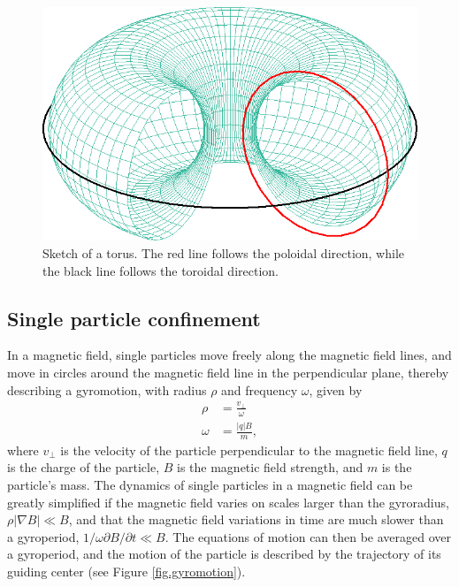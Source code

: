 \documentclass[my_thesis.tex]{subfiles}
\begin{document}
\begin{figure}
    \centering
    \includegraphics[width=.75\linewidth]{images/torus.png}
    \caption{Sketch of a torus. The red line follows the poloidal direction, while the black line follows the toroidal direction.}
    \label{fig.torus}
\end{figure}

\subsection{Single particle confinement}\label{sec.single particle confinement}
In a magnetic field, single particles move freely along the magnetic field lines, and move in circles around the magnetic field line in the perpendicular plane, thereby describing a gyromotion, with radius $\rho$ and frequency $\omega$, given by
\begin{align}
    \rho &= \frac{v_\perp}{\omega}\label{eq.gyroradius}\\
    \omega &= \frac{|q|B}{m},
\end{align}
where $v_\perp$ is the velocity of the particle perpendicular to the magnetic field line, $q$ is the charge of the particle, $B$ is the magnetic field strength, and $m$ is the particle's mass. The dynamics of single particles in a magnetic field can be greatly simplified if the magnetic field varies on scales larger than the gyroradius, $\rho|\nabla B|\ll B$, and that the magnetic field variations in time are much slower than a gyroperiod, $1/\omega \partial B/\partial t \ll B$. The equations of motion can then be averaged over a gyroperiod, and the motion of the particle is described by the trajectory of its guiding center (see Figure \ref{fig.gyromotion}).
\end{document}
